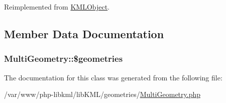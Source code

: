 Reimplemented from \hyperlink{classKMLObject_ae3c03ef6e733a6e8e59fb28672d4e334}{KMLObject}.



\subsection{Member Data Documentation}
\hypertarget{classMultiGeometry_a4fc5292c6cd8700952c08f0176640182}{
\subsubsection[{\$geometries}]{\setlength{\rightskip}{0pt plus 5cm}MultiGeometry::\$geometries}}
\label{df/d63/classMultiGeometry_a4fc5292c6cd8700952c08f0176640182}


The documentation for this class was generated from the following file:\begin{DoxyCompactItemize}
\item 
/var/www/php-\/libkml/libKML/geometries/\hyperlink{MultiGeometry_8php}{MultiGeometry.php}\end{DoxyCompactItemize}
